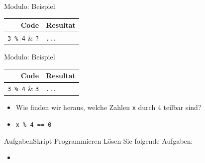 \begin{frame}[fragile]{Modulo: Beispiel}
    \begin{table}
        \begin{tabular}{rl}
            \textbf{Code}     & \textbf{Resultat} \\\midrule
            \lstinline|3 % 4| & \lstinline|?|     \\\midrule
            \lstinline|4 % 4| & \lstinline|?|     \\\midrule
            \lstinline|5 % 4| & \lstinline|?|     \\\midrule
            \lstinline|6 % 4| & \lstinline|?|     \\\midrule
            \lstinline|7 % 4| & \lstinline|?|     \\\midrule
            \lstinline|8 % 4| & \lstinline|?|     \\\midrule
            \lstinline|...|   & \lstinline|...|
        \end{tabular}
    \end{table}
\end{frame}
\begin{frame}[fragile]{Modulo: Beispiel}
    \begin{table}
        \begin{tabular}{rl}
            \textbf{Code}     & \textbf{Resultat} \\\midrule
            \lstinline|3 % 4| & \lstinline|3|     \\\midrule
            \lstinline|4 % 4| & \lstinline|0|     \\\midrule
            \lstinline|5 % 4| & \lstinline|1|     \\\midrule
            \lstinline|6 % 4| & \lstinline|2|     \\\midrule
            \lstinline|7 % 4| & \lstinline|3|     \\\midrule
            \lstinline|8 % 4| & \lstinline|0|     \\\midrule
            \lstinline|...|   & \lstinline|...|
        \end{tabular}
    \end{table}

    \begin{itemize}[<+->]
        \item Wie finden wir heraus, welche Zahlen \lstinline|x| durch 4 teilbar sind?
        \item \lstinline|x % 4 == 0|
    \end{itemize}
\end{frame}

\begin{frame}{Aufgaben}{Skript Programmieren}
    Lösen Sie folgende Aufgaben:
    \begin{itemize}
        \item {}
    \end{itemize}
\end{frame}